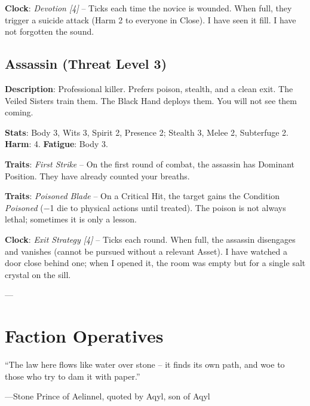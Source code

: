 \noindent\textbf{Clock}: \emph{Devotion [4]} -- Ticks each time the novice is wounded. When full, they trigger a suicide attack (Harm 2 to everyone in Close). I have seen it fill. I have not forgotten the sound.


\subsection*{Assassin (Threat Level 3)}

\noindent\textbf{Description}: Professional killer. Prefers poison, stealth, and a clean exit. The Veiled Sisters train them. The Black Hand deploys them. You will not see them coming.

\noindent\textbf{Stats}: Body 3, Wits 3, Spirit 2, Presence 2; Stealth 3, Melee 2, Subterfuge 2.\\
\textbf{Harm}: 4. \textbf{Fatigue}: Body 3.

\noindent\textbf{Traits}: \emph{First Strike} -- On the first round of combat, the assassin has Dominant Position. They have already counted your breaths.

\noindent\textbf{Traits}: \emph{Poisoned Blade} -- On a Critical Hit, the target gains the Condition \emph{Poisoned} (−1 die to physical actions until treated). The poison is not always lethal; sometimes it is only a lesson.

\noindent\textbf{Clock}: \emph{Exit Strategy [4]} -- Ticks each round. When full, the assassin disengages and vanishes (cannot be pursued without a relevant Asset). I have watched a door close behind one; when I opened it, the room was empty but for a single salt crystal on the sill.


---

\section*{Faction Operatives}

\epigraph{``The law here flows like water over stone -- it finds its own path, and woe to those who try to dam it with paper.''}{---Stone Prince of Aelinnel, quoted by Aqyl, son of Aqyl}

